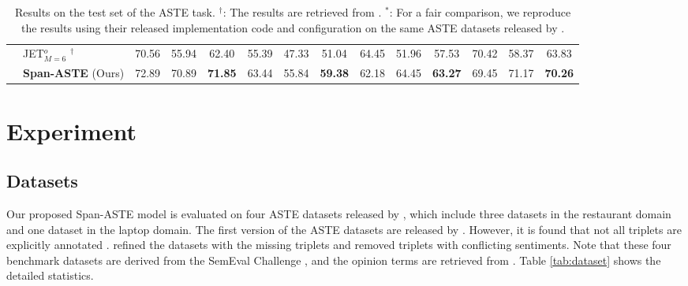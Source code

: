 \documentclass[11pt,a4paper]{article}
\begin{document}
\begin{table*}[!t]
{\begin{tabular}{llcccccccccccc}
     &{JET}$^o_{M=6}$ \cite{Xu2020PositionAwareTF} $^{\dag}$& 70.56 & 55.94 & 62.40 & 55.39 & 47.33 & 51.04 & 64.45 & 51.96 & 57.53 & 70.42 & 58.37 & 63.83 \\
    \cmidrule(lr){2-14}
     &\textbf{Span-ASTE} (Ours) &  72.89 & 70.89 & \textbf{71.85} & 63.44 & 55.84 & \textbf{59.38} & 62.18 & 64.45 & \textbf{63.27} & 69.45 & 71.17 & \textbf{70.26} \\

\bottomrule
    \end{tabular}
    }
\caption{
    Results on the test set of the ASTE task. 
    $^{\dag}$: The results are retrieved from \citet{Xu2020PositionAwareTF}.
    $^*$: For a fair comparison, we reproduce the results using their released implementation code and configuration on the same ASTE datasets released by \citet{Xu2020PositionAwareTF}.
} 
    \label{tab:main_results}
\end{table*}



\section{Experiment}
\subsection{Datasets}

Our proposed Span-ASTE model is evaluated on four ASTE datasets released by \citet{Xu2020PositionAwareTF}, which include three datasets in the restaurant domain and one dataset in the laptop domain. The first version of the ASTE datasets are released by \citet{peng2019knowing}. However, it is found that not all triplets are explicitly annotated \cite{Xu2020PositionAwareTF, wu-etal-2020-grid}.  \citet{Xu2020PositionAwareTF} refined the datasets with the missing triplets and removed triplets with conflicting sentiments.  Note that these four benchmark datasets are derived from the SemEval Challenge \cite{pontiki-EtAl:2014:SemEval, pontiki-etal-2015-semeval, pontiki2016semeval}, and the opinion terms are retrieved from \cite{fan2019target}. Table \ref{tab:dataset} shows the detailed statistics.
\end{document}
